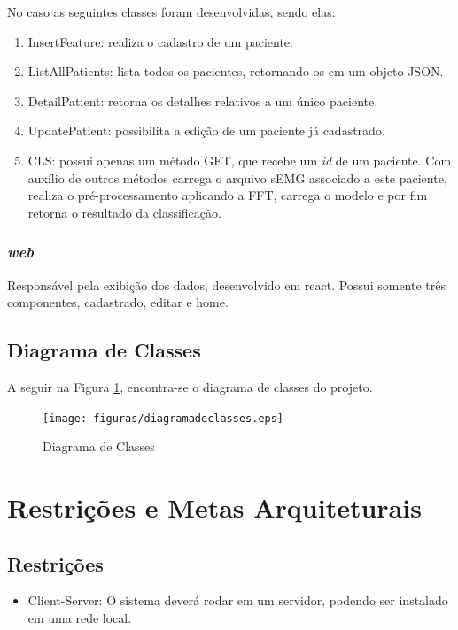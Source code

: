 \begin{anexosenv}
    No caso as seguintes classes foram desenvolvidas, sendo elas:
    \begin{enumerate}
        \item InsertFeature: realiza o cadastro de um paciente.
        \item ListAllPatients: lista todos os pacientes, retornando-os em um objeto JSON.
        \item DetailPatient: retorna os detalhes relativos a um único paciente.
        \item UpdatePatient: possibilita a edição de um paciente já cadastrado.
        \item CLS: possui apenas um método GET, que recebe um \textit{id} de um paciente. Com auxílio de outros métodos carrega o arquivo sEMG associado a este paciente, realiza o pré-processamento aplicando a FFT, carrega o modelo e por fim retorna o resultado da classificação.
    \end{enumerate}

    \subsubsection{\textit{web}}
    Responsável pela exibição dos dados, desenvolvido em react. Possui somente três componentes, cadastrado, editar e home.

   \subsection{Diagrama de Classes}
   A seguir na Figura \ref{diagramadeclasses}, encontra-se o diagrama de classes do projeto.
   \begin{figure}[!htb]
        \centering
        \texttt{[image: figuras/diagramadeclasses.eps]}
        \caption{Diagrama de Classes}
        \label{diagramadeclasses}
   \end{figure}
  
    \section{Restrições e Metas Arquiteturais}
    \subsection{Restrições}
    \begin{itemize}
        \item Client-Server: O sistema deverá rodar em um servidor, podendo ser instalado em uma rede local.
    \end{itemize}
  


\end{anexosenv}
